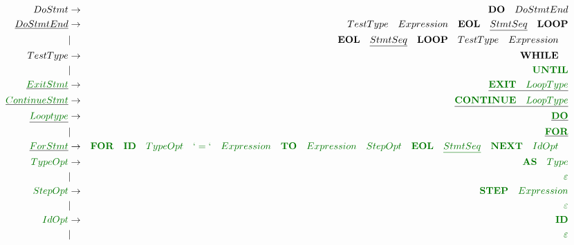 \documentclass[a4paper,11pt,landscape,leqno]{article}
\begin{document}
\begin{eqnarray}
DoStmt&    \rightarrow    & \textbf{DO} \quad DoStmtEnd   \\
\underline{DoStmtEnd}&   \rightarrow  &  TestType \quad  Expression \quad \textbf{EOL} \quad \underline{StmtSeq} \quad \textbf{LOOP}    \\
&    | &\textbf{EOL} \quad \underline{StmtSeq} \quad \textbf{LOOP}\quad TestType \quad  Expression \quad   \\
TestType & \rightarrow  &   \textbf{WHILE}\quad \\
        &       |       & \textcolor{green1}{\textbf{UNTIL}} \\
\underline{\textcolor{green1}{ExitStmt}} & \rightarrow & \underline{\textcolor{green1}{\textbf{EXIT}\quad LoopType}}    \\
\underline{\textcolor{green1}{ContinueStmt}} & \rightarrow & \underline{\textcolor{green1}{\textbf{CONTINUE}\quad LoopType}}    \\
\underline{\textcolor{green1}{Looptype}} & \rightarrow & \underline{\textcolor{green1}{\textbf{DO}}}\\
&   |       &   \underline{\textcolor{green1}{\textbf{FOR}}}   \\
\underline{\textcolor{green1}{ForStmt}} &    \rightarrow    &  \textcolor{green1}{\textbf{FOR}\quad \textbf{ID}\quad TypeOpt\quad `=`\quad Expression\quad \textbf{TO}\quad Expression\quad StepOpt\quad \textbf{EOL}\quad \underline{StmtSeq}\quad \textbf{NEXT}\quad IdOpt\quad} \\
\textcolor{green1}{TypeOpt} & \rightarrow  & \textcolor{green1}{\textbf{AS}\quad Type} \\
& | &   \textcolor{green1}{\varepsilon} \\
\textcolor{green1}{StepOpt} & \rightarrow  & \textcolor{green1}{\textbf{STEP}\quad Expression} \\
& | &   \textcolor{green1}{\varepsilon} \\
\textcolor{green1}{IdOpt}   & \rightarrow & \textcolor{green1}{\textbf{ID}} \\
        & | &  \textcolor{green1}{\varepsilon} \\

\end{eqnarray}
\end{document}
